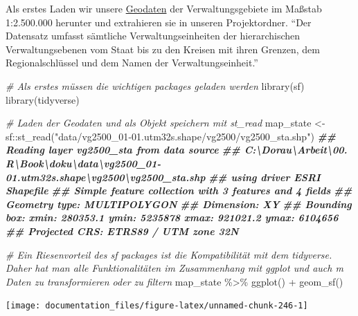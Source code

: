 \documentclass[
]{article}
\newenvironment{Shaded}{\begin{snugshade}}{\end{snugshade}}
\newcommand{\CommentTok}[1]{\textcolor[rgb]{0.56,0.35,0.01}{\textit{#1}}}
\newcommand{\DocumentationTok}[1]{\textcolor[rgb]{0.56,0.35,0.01}{\textbf{\textit{#1}}}}
\newcommand{\FunctionTok}[1]{\textcolor[rgb]{0.00,0.00,0.00}{#1}}
\newcommand{\NormalTok}[1]{#1}
\newcommand{\OtherTok}[1]{\textcolor[rgb]{0.56,0.35,0.01}{#1}}
\newcommand{\SpecialCharTok}[1]{\textcolor[rgb]{0.00,0.00,0.00}{#1}}
\newcommand{\StringTok}[1]{\textcolor[rgb]{0.31,0.60,0.02}{#1}}
\begin{document}
Als erstes Laden wir unsere \href{https://gdz.bkg.bund.de/index.php/default/digitale-geodaten/verwaltungsgebiete/verwaltungsgebiete-1-2-500-000-stand-01-01-vg2500.html}{Geodaten} der Verwaltungsgebiete im Maßstab 1:2.500.000 herunter und extrahieren sie in unseren Projektordner. ``Der Datensatz umfasst sämtliche Verwaltungseinheiten der hierarchischen Verwaltungsebenen vom Staat bis zu den Kreisen mit ihren Grenzen, dem Regionalschlüssel und dem Namen der Verwaltungseinheit.''

\begin{Shaded}
\begin{Highlighting}[]

\CommentTok{\# Als erstes müssen die wichtigen packages geladen werden}
\FunctionTok{library}\NormalTok{(sf)}
\FunctionTok{library}\NormalTok{(tidyverse)}

\CommentTok{\# Laden der Geodaten und als Objekt speichern mit \textasciigrave{}st\_read\textasciigrave{}}
\NormalTok{map\_state }\OtherTok{\textless{}{-}}\NormalTok{ sf}\SpecialCharTok{::}\FunctionTok{st\_read}\NormalTok{(}\StringTok{"data/vg2500\_01{-}01.utm32s.shape/vg2500/vg2500\_sta.shp"}\NormalTok{)}
\DocumentationTok{\#\# Reading layer \textasciigrave{}vg2500\_sta\textquotesingle{} from data source }
\DocumentationTok{\#\#   \textasciigrave{}C:\textbackslash{}Dorau\textbackslash{}Arbeit\textbackslash{}00. R\textbackslash{}Book\textbackslash{}doku\textbackslash{}data\textbackslash{}vg2500\_01{-}01.utm32s.shape\textbackslash{}vg2500\textbackslash{}vg2500\_sta.shp\textquotesingle{} }
\DocumentationTok{\#\#   using driver \textasciigrave{}ESRI Shapefile\textquotesingle{}}
\DocumentationTok{\#\# Simple feature collection with 3 features and 4 fields}
\DocumentationTok{\#\# Geometry type: MULTIPOLYGON}
\DocumentationTok{\#\# Dimension:     XY}
\DocumentationTok{\#\# Bounding box:  xmin: 280353.1 ymin: 5235878 xmax: 921021.2 ymax: 6104656}
\DocumentationTok{\#\# Projected CRS: ETRS89 / UTM zone 32N}

\CommentTok{\# Ein Riesenvorteil des sf packages ist die Kompatibilität mit dem tidyverse. Daher hat man alle Funktionalitäten im Zusammenhang mit ggplot und auch m Daten zu transformieren oder zu filtern}
\NormalTok{map\_state }\SpecialCharTok{\%\textgreater{}\%}
  \FunctionTok{ggplot}\NormalTok{() }\SpecialCharTok{+}
  \FunctionTok{geom\_sf}\NormalTok{()}
\end{Highlighting}
\end{Shaded}

\begin{center}\texttt{[image: documentation\_files/figure-latex/unnamed-chunk-246-1]} \end{center}
\end{document}
